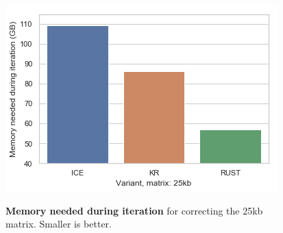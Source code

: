
\begin{figure}[t]
    \begin{centering}
        {\includegraphics[scale=1]{figures/results/memiter_25}}
        \caption[Memory needs iterating 25kb]
        {\textbf{Memory needed during iteration} for correcting the 25kb matrix. Smaller is better.}
        \label{fig:memiter25}
\end{centering}
\end{figure}

